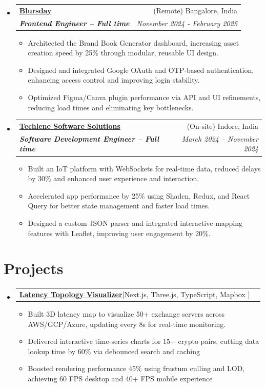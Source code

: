 \documentclass[letterpaper,10pt]{article}
\makeatletter
\newcommand{\resumeItem}[1]{
    \item\small{
      {#1 \vspace{-1pt}}
    }
  }
\newcommand{\resumeSubheading}[4]{
  \item
    \begin{tabular*}{0.97\textwidth}[t]{l@{\extracolsep{\fill}}r}
      {#1} & #2 \\
      \textit{\small#3} & \textit{\small #4} \\
    \end{tabular*}\vspace{-5pt}
}
\newcommand{\resumeProjectHeading}[2]{
    \item
    \begin{tabular*}{0.97\textwidth}{l@{\extracolsep{\fill}}r}
      \small#1 & #2 \\
    \end{tabular*}\vspace{-5pt}
}
\newcommand{\resumeSubHeadingListStart}{\begin{itemize}[leftmargin=0.15in, label={}]}
\newcommand{\resumeSubHeadingListEnd}{\end{itemize}}
\newcommand{\resumeItemListStart}{\begin{itemize}}
\newcommand{\resumeItemListEnd}{\end{itemize}}
\makeatother
\begin{document}
\resumeSubHeadingListStart
\resumeSubheading
{\textbf{\href{https://blursday.ai}{Blursday}\hspace{5pt}}{{}}}{(Remote) Bangalore, India}
{\textbf{Frontend Engineer – Full time}}{November 2024 - February 2025}
\resumeItemListStart
\resumeItem{Architected the Brand Book Generator dashboard, increasing asset creation speed by 25\% through modular, reusable UI design.
}
\resumeItem{Designed and integrated Google OAuth and OTP-based authentication, enhancing access control and improving login stability.
}
\resumeItem{Optimized Figma/Canva plugin performance via API and UI refinements, reducing load times and eliminating key bottlenecks.
}
\resumeItemListEnd
\resumeSubHeadingListEnd


\resumeSubHeadingListStart
\resumeSubheading
  {\textbf{\href{https://techlene.com}{Techlene Software Solutions}\hspace{5pt}}{}}{(On-site) Indore, India}
  {\textbf{Software Development Engineer – Full time}}{March 2024 -- November 2024}
  \resumeItemListStart
    \resumeItem{Built an IoT platform with WebSockets for real-time data, reduced delays by 30\% and enhanced user experience and interaction.}
    \resumeItem{Accelerated app performance by 25\% using Shadcn, Redux, and React Query for better state management and faster load times.}
    \resumeItem{Designed a custom JSON parser and integrated interactive mapping features with Leaflet, improving user engagement by 20\%.}
  \resumeItemListEnd
\resumeSubHeadingListEnd



\section{Projects}

\resumeSubHeadingListStart
\resumeProjectHeading
{\textbf{\href{https://github.com/shanutiwari1010/latency-topology-visualizer}{Latency Topology Visualizer}\hspace{5pt}}{{[Next.js, Three.js, TypeScript, Mapbox ]}}}{}
\resumeItemListStart
  \resumeItem{Built 3D latency map to visualize 50+ exchange servers across AWS/GCP/Azure, updating every 8s for real-time monitoring.}
  \resumeItem{Delivered interactive time-series charts for 15+ crypto pairs, cutting data lookup time by 60\% via debounced search and caching}
  \resumeItem{Boosted rendering performance 45\% using frustum culling and LOD, achieving 60 FPS desktop and 40+ FPS mobile experience
}
\resumeItemListEnd
\resumeSubHeadingListEnd
\end{document}
